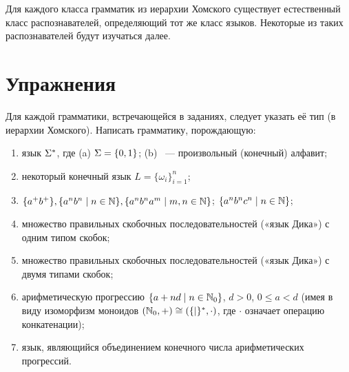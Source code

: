 Для каждого класса грамматик из иерархии Хомского существует
естественный класс распознавателей, определяющий тот же класс языков.
Некоторые из таких распознавателей будут изучаться далее.

\section{Упражнения}
\label{Chapter1Exs}

Для каждой грамматики, встречающейся в заданиях, следует указать её тип (в
иерархии Хомского). Написать грамматику, порождающую:
\begin{enumerate}
 \item язык $\Sigma^{\ast}$, где (a) $\Sigma = \{0, 1\}$; (b) \Sig{}~— произвольный
 (конечный) алфавит;

 \item некоторый конечный язык $L = \{\omega_i\}^n_{i=1}$;

 \item $\{a^{+}b^{+}\}, \{a^nb^n \mid n \in \mathbb N\}, \{a^nb^na^m \mid m, n \in
     \mathbb N\}$; $\{ a^nb^nc^n \mid n \in \mathbb N \}$;

 \item множество правильных скобочных последовательностей («язык Дика») с
     одним типом скобок;
 \item множество правильных скобочных последовательностей («язык Дика») с
     двумя типами скобок;
  \item арифметическую прогрессию $\{a + nd \mid n \in \mathbb N_0\}$, $d > 0$, $0
    \leqslant a < d$ (имея в виду изоморфизм моноидов $(\mathbb N_0, +) \cong
    (\{|\}^{\ast}, {\cdot})$, где ${\cdot}$ означает операцию конкатенации);
   \item язык, являющийся объединением конечного числа арифметических прогрессий.
\end{enumerate}
